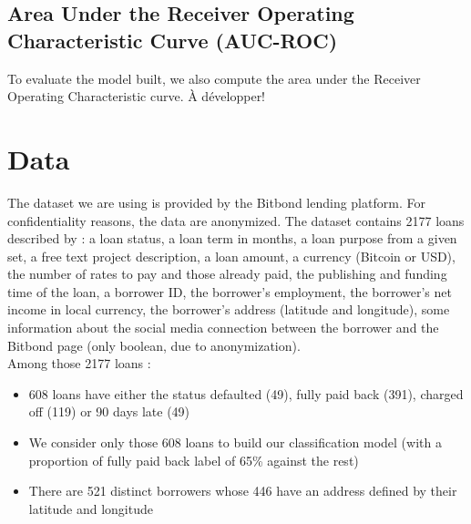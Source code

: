 	\subsection{Area Under the Receiver Operating Characteristic Curve (AUC-ROC)}
		To evaluate the model built, we also compute the area under the Receiver Operating Characteristic curve.
		À développer!

\section{Data}\label{sec:data}
	The dataset we are using is provided by the Bitbond lending platform. For confidentiality reasons, the data are anonymized. The dataset contains 2177 loans described by : a loan status, a loan term in months, a loan purpose from a given set, a free text project description, a loan amount, a currency (Bitcoin or USD), the number of rates to pay and those already paid, the publishing and funding time of the loan, a borrower ID, the borrower's employment, the borrower's net income in local currency, the borrower's address (latitude and longitude), some information about the social media connection between the borrower and the Bitbond page (only boolean, due to anonymization).\\

	Among those 2177 loans :
	\begin{itemize}
		\item 608 loans have either the status defaulted (49), fully paid back (391), charged off (119) or 90 days late (49)
		\item We consider only those 608 loans to build our classification model (with a proportion of fully paid back label of 65\% against the rest)
		\item There are 521 distinct borrowers whose 446 have an address defined by their latitude and longitude
	\end{itemize}